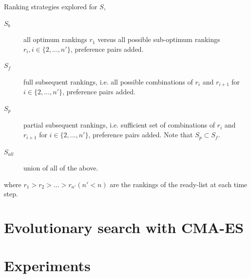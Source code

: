 \documentclass[xcolor=pdftex,t,11pt,handout]{beamer}
\begin{document}
{\framebreak
\begin{block}{Ranking strategies explored for $S$,}
\begin{description}
\item[$S_{b}$] all optimum rankings $r_1$ versus all possible sub-optimum rankings $r_i, i\in\{2,...,n'\}$, preference pairs added.
\item[$S_{f}$] full subsequent rankings, i.e. all possible combinations of $r_i$ and $r_{i+1}$ for $i\in\{2,...,n'\}$, preference pairs added.
\item[$S_{p}$] partial subsequent rankings, i.e. sufficient set of combinations of $r_i$ and $r_{i+1}$ for $i\in\{2,...,n'\}$, preference pairs added. Note that $S_{p}\subset S_{f}$.
\item[$S_{all}$] union of all of the above.
\end{description}
where $r_1>r_2>...>r_{n'} (n'<n)$ are the rankings of the ready-list at each time step.
\end{block}
}

\section{Evolutionary search with CMA-ES}
\frame{\tableofcontents[currentsection]}




\section{Experiments}
\frame{\tableofcontents[currentsection]}
\end{document}
